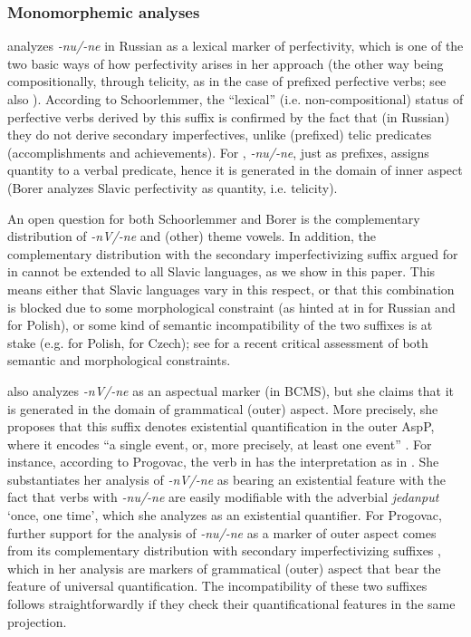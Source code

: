 \documentclass[output=paper,colorlinks,citecolor=brown]{langscibook}
\begin{document}
\subsubsection{Monomorphemic analyses} \label{str:sect:monomorphemic analyses}

\citet{Schoorlemmer2004} analyzes \textit{-nu/-ne} in Russian as a lexical marker of perfectivity, which is one of the two basic ways of how perfectivity arises in her approach (the other way being compositionally, through telicity, as in the case of prefixed perfective verbs; see also \citealt{Schoorlemmer1997}). According to Schoorlemmer, the ``lexical'' (i.e. non-compositional) status of perfective verbs derived by this suffix is confirmed by the fact that (in Russian) they do not derive secondary imperfectives, unlike (prefixed) telic predicates (accomplishments and achievements). For \citet{Borer2005, Borer2005Structuring}, \textit{-nu/-ne}, just as prefixes, assigns quantity to a verbal predicate, hence it is generated in the domain of inner aspect (Borer analyzes Slavic perfectivity as quantity, i.e. telicity). 

An open question for both Schoorlemmer and Borer is the complementary distribution of \textit{-nV/-ne} and (other) theme vowels. In addition, the complementary distribution with the secondary imperfectivizing suffix argued for in \citet{Schoorlemmer2004} cannot be extended to all Slavic languages, as we show in this paper. This means either that Slavic languages vary in this respect, or that this combination is blocked due to some morphological constraint (as hinted at in \citealt{Borer2005Structuring} for Russian and \citealt[236]{Kwapiszewski2022} for Polish), or some kind of semantic incompatibility of the two suffixes is at stake (e.g. \citealt{Jablonska2007} for Polish, \citealt{sta+:Biskup2023} for Czech); see \citet[235--236]{Kwapiszewski2022} for a recent critical assessment of both semantic and morphological constraints.

\citet{sta+:Progovac2005} also analyzes \textit{-nV/-ne} as an aspectual marker (in BCMS), but she claims that it is generated in the domain of grammatical (outer) aspect. More precisely, she proposes that this suffix denotes existential quantification in the outer AspP, where it encodes ``a single event, or, more precisely, at least one event'' \citep[109]{sta+:Progovac2005}. For instance, according to Progovac, the verb in  has the interpretation as in . She substantiates her analysis of \textit{-nV/-ne} as bearing an existential feature with the fact that verbs with \textit{-nu/-ne} are easily modifiable with the adverbial \textit{jedanput} `once, one time', which she analyzes as an existential quantifier. For Progovac, further support for the analysis of \textit{\nobreakdash-nu/\nobreakdash-ne} as a marker of outer aspect comes from its complementary distribution with secondary imperfectivizing suffixes , which in her analysis are markers of grammatical (outer) aspect that bear the feature of universal quantification. The incompatibility of these two suffixes follows straightforwardly if they check their quantificational features in the same projection. 
\end{document}
